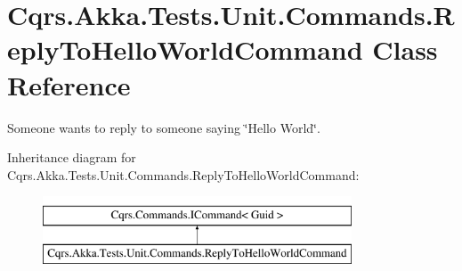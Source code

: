 \hypertarget{classCqrs_1_1Akka_1_1Tests_1_1Unit_1_1Commands_1_1ReplyToHelloWorldCommand}{}\section{Cqrs.\+Akka.\+Tests.\+Unit.\+Commands.\+Reply\+To\+Hello\+World\+Command Class Reference}
\label{classCqrs_1_1Akka_1_1Tests_1_1Unit_1_1Commands_1_1ReplyToHelloWorldCommand}


Someone wants to reply to someone saying \char`\"{}\+Hello World\char`\"{}.  


Inheritance diagram for Cqrs.\+Akka.\+Tests.\+Unit.\+Commands.\+Reply\+To\+Hello\+World\+Command\+:\begin{figure}[H]
\begin{center}
\leavevmode
\includegraphics[height=2.000000cm]{classCqrs_1_1Akka_1_1Tests_1_1Unit_1_1Commands_1_1ReplyToHelloWorldCommand}
\end{center}
\end{figure}
